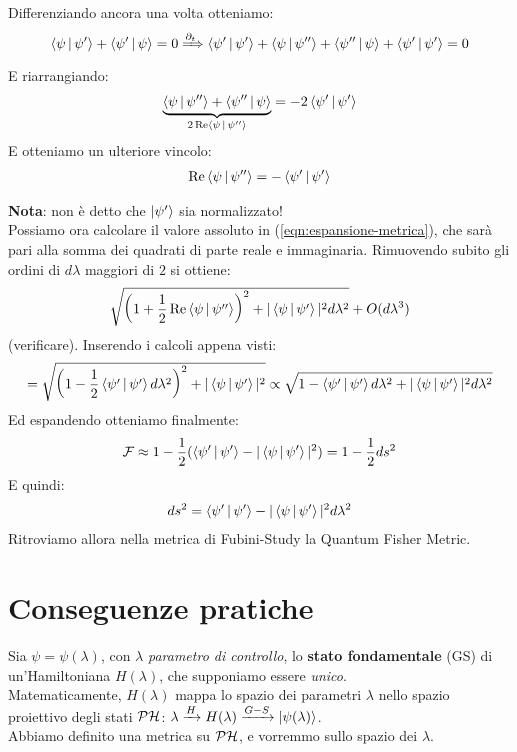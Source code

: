 \documentclass[../../InformazioneQuantistica.tex]{subfiles}
\begin{document}
Differenziando ancora una volta otteniamo:
\begin{align*}
 \Braket{\psi|\psi'} + \Braket{\psi'|\psi} =0 \xRightarrow{\partial_t} \Braket{\psi'|\psi'} + \Braket{\psi|\psi''} + \Braket{\psi''|\psi} + \Braket{\psi'|\psi'} = 0
\end{align*}
E riarrangiando:
\begin{align*}
\underbrace{\Braket{\psi|\psi''} + \Braket{\psi''|\psi}}_{2\operatorname{Re}\Braket{\psi|\psi''}} = -2\Braket{\psi'|\psi'}
\end{align*}
E otteniamo un ulteriore vincolo:
\begin{align*}
\operatorname{Re}\Braket{\psi|\psi''} = -\Braket{\psi'|\psi'}
\end{align*}

\textbf{Nota}: non è detto che $\Ket{\psi'}$ sia normalizzato!
\\

Possiamo ora calcolare il valore assoluto in (\ref{eqn:espansione-metrica}), che sarà pari alla somma dei quadrati di parte reale e immaginaria. Rimuovendo subito gli ordini di $d\lambda$ maggiori di $2$ si ottiene:
\begin{align*}
\sqrt{\left(1+\frac{1}{2}\operatorname{Re}\Braket{\psi|\psi''}\right)^2 + |\Braket{\psi|\psi'}|^2 d\lambda^2} + O(d\lambda^3)
\end{align*}
(verificare). Inserendo i calcoli appena visti:
\begin{align*}
= \sqrt{\left(1-\frac{1}{2}\Braket{\psi'|\psi'} d\lambda^2\right)^2 + |\Braket{\psi|\psi'}|^2 } \propto \sqrt{1-\Braket{\psi'|\psi' }d\lambda^2 + |\Braket{\psi|\psi'}|^2 d\lambda^2}
\end{align*}
Ed espandendo otteniamo finalmente:
\begin{align*}
\mathcal{F} \approx 1-\frac{1}{2}(\Braket{\psi'|\psi'} - |\Braket{\psi|\psi'}|^2) = 1-\frac{1}{2}ds^2 
\end{align*}
E quindi:
\begin{align*}
ds^2 = \Braket{\psi'|\psi'}-|\Braket{\psi|\psi'}|^2 d\lambda^2 
\end{align*}
Ritroviamo allora nella metrica di Fubini-Study la Quantum Fisher Metric.

\section{Conseguenze pratiche}
Sia $\psi=\psi(\lambda)$, con $\lambda$ \textit{parametro di controllo}, lo \textbf{stato fondamentale} (GS) di un'Hamiltoniana $H(\lambda)$, che supponiamo essere \textit{unico}.\\
Matematicamente, $H(\lambda)$ mappa lo spazio dei parametri $\lambda$ nello spazio proiettivo degli stati $\mathcal{P}\mathcal{H}$: $\lambda \xrightarrow{H} H(\lambda) \xrightarrow{G-S} \Ket{\psi(\lambda)}$.\\
Abbiamo definito una metrica su $\mathcal{P}\mathcal{H}$, e vorremmo  sullo spazio dei $\lambda$.\\
\end{document}
